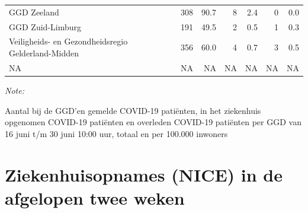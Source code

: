 \documentclass[
  english,
  man,floatsintext]{apa6}
\begin{document}
\begin{table}
\begin{threeparttable}
\begin{tabular}{lrrrrrr}
GGD Zeeland & 308 & 90.7 & 8 & 2.4 & 0 & 0.0\\
GGD Zuid-Limburg & 191 & 49.5 & 2 & 0.5 & 1 & 0.3\\
Veiligheids- en Gezondheidsregio Gelderland-Midden & 356 & 60.0 & 4 & 0.7 & 3 & 0.5\\
NA & NA & NA & NA & NA & NA & NA\\
\bottomrule
\end{tabular}
\begin{tablenotes}
\item \textit{Note: } 
\item Aantal bij de GGD’en gemelde COVID-19 patiënten, in het ziekenhuis opgenomen COVID-19 patiënten en overleden COVID-19 patiënten per GGD van 16 juni t/m 30 juni 10:00 uur, totaal en per 100.000 inwoners
\end{tablenotes}
\end{threeparttable}
\endgroup{}
\end{table}

\newpage

\hypertarget{ziekenhuisopnames-nice-in-de-afgelopen-twee-weken}{%
\section{Ziekenhuisopnames (NICE) in de afgelopen twee weken}\label{ziekenhuisopnames-nice-in-de-afgelopen-twee-weken}}
\end{document}
